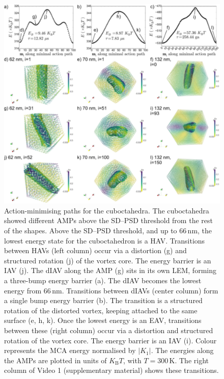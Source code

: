 \documentclass[review]{elsarticle}
\begin{document}
\allowdisplaybreaks

\begin{figure}[ht]
\centering
\includegraphics[width=\textwidth]{Figure_08.pdf}
\caption{Action-minimising paths for the cuboctahedra. The cuboctahedra showed different AMPs above the SD--PSD threshold from the rest of the shapes. Above the SD--PSD threshold, and up to 66$\,\text{nm}$, the lowest energy state for the cuboctahedron is a HAV. Transitions between HAVs (left column) occur via a distortion (g) and structured rotation (j) of the vortex core. The energy barrier is an IAV (j). The dIAV along the AMP (g) sits in its own LEM, forming a three-bump energy barrier (a). The dIAV becomes the lowest energy from 66$\,\text{nm}$. Transitions between dIAVs (center column) form a single bump energy barrier (b). The transition is a structured rotation of the distorted vortex, keeping attached to the same surface (e, h, k). Once the lowest energy is an EAV, transitions between these (right column) occur via a distortion and structured rotation of the vortex core. The energy barrier is an IAV (i). Colour represents the MCA energy normalised by $|K_1|$. The energies along the AMPs are plotted in units of $K_\text{B}T$, with $T=300\,\text{K}$. The right column of Video 1 (supplementary material) shows these transitions.}
\label{fig8}
\end{figure}
\end{document}
